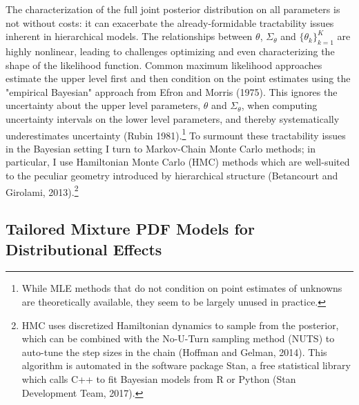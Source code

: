 \documentclass[english,12pt]{article}\usepackage{lmodern}
\numberwithin{equation}{section}
\begin{document}
The characterization of the full joint posterior distribution on all parameters is not without costs: it can exacerbate the already-formidable tractability issues inherent in hierarchical models. The relationships between $\theta$, $\Sigma_{\theta}$ and $\{\theta_k \}_{k=1}^K$ are highly nonlinear, leading to challenges optimizing and even characterizing the shape of the likelihood function. Common maximum likelihood approaches estimate the upper level first and then condition on the point estimates using the "empirical Bayesian" approach from Efron and Morris (1975). This ignores the uncertainty about the upper level parameters, $\theta$ and $\Sigma_{\theta}$, when computing uncertainty intervals on the lower level parameters, and thereby systematically underestimates uncertainty (Rubin 1981).\footnote{While MLE methods that do not condition on point estimates of unknowns are theoretically available, they seem to be largely unused in practice.} To surmount these tractability issues in the Bayesian setting I turn to Markov-Chain Monte Carlo methods; in particular, I use Hamiltonian Monte Carlo (HMC) methods which are well-suited to the peculiar geometry introduced by hierarchical structure (Betancourt and Girolami, 2013).\footnote{HMC uses discretized Hamiltonian dynamics to sample from the posterior, which can be combined with the No-U-Turn sampling method (NUTS) to auto-tune the step sizes in the chain (Hoffman and Gelman, 2014). This algorithm is automated in the software package Stan, a free statistical library which calls C++ to fit Bayesian models from R or Python (Stan Development Team, 2017).}

\subsection{Tailored Mixture PDF Models for Distributional Effects}
\end{document}
